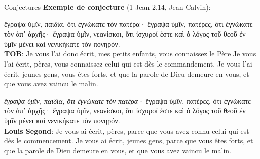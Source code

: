 \documentclass[11pt]{beamer}
\begin{document}
\begin{frame}{Conjectures}
    \textbf{Exemple de conjecture} (1 Jean 2,14, Jean Calvin):\\
        \begin{minipage}{.4\textwidth}
    \footnotesize
    \begin{exampleblock}{}
    \textgreek{ἔγραψα ὑμῖν, παιδία, ὅτι ἐγνώκατε τὸν πατέρα· ἔγραψα ὑμῖν, πατέρες, ὅτι ἐγνώκατε τὸν ἀπ᾽ ἀρχῆς· ἔγραψα ὑμῖν, νεανίσκοι, ὅτι ἰσχυροί ἐστε καὶ ὁ λόγος τοῦ θεοῦ ἐν ὑμῖν μένει καὶ νενικήκατε τὸν πονηρόν.}\\
    \vspace{.5cm}
    \textbf{TOB}: Je vous l'ai donc écrit, mes petits enfants, \og vous connaissez le Père \fg\.
    Je vous l'ai écrit, pères, \og vous connaissez celui qui est dès le commandement\fg. Je vous l'ai écrit, jeunes gens, \og vous êtes forts, et que la parole de Dieu demeure en vous, et que vous avez vaincu le malin\fg.\\
    \end{exampleblock}
    \end{minipage}%
    \hfill
    \begin{minipage}{.4\textwidth}
    \footnotesize
\textgreek{\emph{ἔγραψα ὑμῖν, παιδία, ὅτι ἐγνώκατε τὸν πατέρα·} ἔγραψα ὑμῖν, πατέρες, ὅτι ἐγνώκατε τὸν ἀπ᾽ ἀρχῆς· ἔγραψα ὑμῖν, νεανίσκοι, ὅτι ἰσχυροί ἐστε καὶ ὁ λόγος τοῦ θεοῦ ἐν ὑμῖν μένει καὶ νενικήκατε τὸν πονηρόν.}\\

\pause
    \textbf{Louis Segond}: Je vous ai écrit, pères, parce que vous avez connu celui qui est dès le commencement. Je vous ai écrit, jeunes gens, parce que vous êtes forts, et que la parole de Dieu demeure en vous, et que vous avez vaincu le malin.\\
    \end{minipage}
    
\end{frame}
\end{document}
